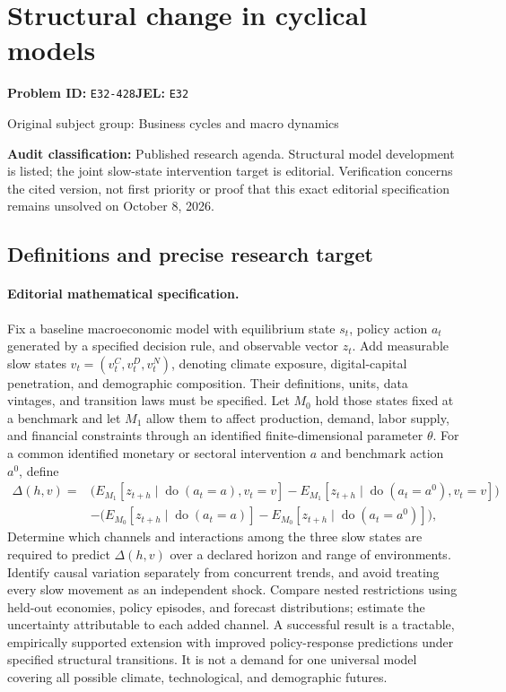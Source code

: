 \documentclass[11pt,a4paper]{article}
\begin{document}
\section*{Structural change in cyclical models}
\textbf{Problem ID:} \texttt{E32-428}\quad \textbf{JEL:} \texttt{E32}\par
\label{problem:OP-0240}
{\sffamily\small\color{muted}Original subject group: Business cycles and macro dynamics\par}
\label{definitions:problem:30007521}
\textbf{Audit classification:} Published research agenda. Structural model development is listed; the joint slow-state intervention target is editorial. Verification concerns the cited version, not first priority or proof that this exact editorial specification remains unsolved on October 8, 2026.
\subsection*{Definitions and precise research target}
\paragraph{Editorial mathematical specification.} Fix a baseline macroeconomic model with equilibrium state \(s_t\), policy action \(a_t\) generated by a specified decision rule, and observable vector \(z_t\). Add measurable slow states \(v_t=(v_t^C,v_t^D,v_t^N)\), denoting climate exposure, digital-capital penetration, and demographic composition. Their definitions, units, data vintages, and transition laws must be specified. Let \(M_0\) hold those states fixed at a benchmark and let \(M_1\) allow them to affect production, demand, labor supply, and financial constraints through an identified finite-dimensional parameter \(\theta\).
For a common identified monetary or sectoral intervention \(a\) and benchmark action \(a^0\), define
\[
\begin{split}
\Delta(h,v)={}&\big(E_{M_1}[z_{t+h}\mid\operatorname{do}(a_t=a),v_t=v]
-E_{M_1}[z_{t+h}\mid\operatorname{do}(a_t=a^0),v_t=v]\big)\\
&-\big(E_{M_0}[z_{t+h}\mid\operatorname{do}(a_t=a)]
-E_{M_0}[z_{t+h}\mid\operatorname{do}(a_t=a^0)]\big),
\end{split}
\]
Determine which channels and interactions among the three slow states are required to predict \(\Delta(h,v)\) over a declared horizon and range of environments. Identify causal variation separately from concurrent trends, and avoid treating every slow movement as an independent shock. Compare nested restrictions using held-out economies, policy episodes, and forecast distributions; estimate the uncertainty attributable to each added channel. A successful result is a tractable, empirically supported extension with improved policy-response predictions under specified structural transitions. It is not a demand for one universal model covering all possible climate, technological, and demographic futures.
\end{document}
